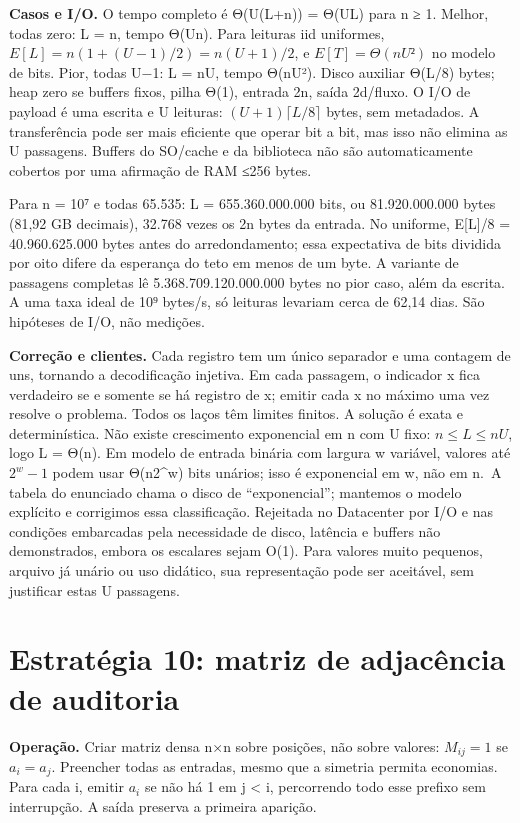 \documentclass[
  brazilian,
  11pt,
  a4paper,
]{article}
\let\oldsection\section
\renewcommand{\section}{\Needspace{6\baselineskip}\oldsection}
\begin{document}
\textbf{Casos e I/O.} O tempo completo é Θ(U(L+n)) = Θ(UL) para n ≥ 1.
Melhor, todas zero: L = n, tempo Θ(Un). Para leituras iid uniformes,
\(E[L]=n(1+(U-1)/2)=n(U+1)/2\), e \(E[T]=\Theta(nU²)\) no modelo de
bits. Pior, todas U−1: L = nU, tempo Θ(nU²). Disco auxiliar Θ(L/8)
bytes; heap zero se buffers fixos, pilha Θ(1), entrada 2n, saída
2d/fluxo. O I/O de payload é uma escrita e U leituras:
\((U+1)\lceil L/8\rceil\) bytes, sem metadados. A transferência pode ser
mais eficiente que operar bit a bit, mas isso não elimina as U
passagens. Buffers do SO/cache e da biblioteca não são automaticamente
cobertos por uma afirmação de RAM ≤256 bytes.

Para n = 10⁷ e todas 65.535: L = 655.360.000.000 bits, ou 81.920.000.000
bytes (81,92 GB decimais), 32.768 vezes os 2n bytes da entrada. No
uniforme, E{[}L{]}/8 = 40.960.625.000 bytes antes do arredondamento;
essa expectativa de bits dividida por oito difere da esperança do teto
em menos de um byte. A variante de passagens completas lê
5.368.709.120.000.000 bytes no pior caso, além da escrita. A uma taxa
ideal de 10⁹ bytes/s, só leituras levariam cerca de 62,14 dias. São
hipóteses de I/O, não medições.

\textbf{Correção e clientes.} Cada registro tem um único separador e uma
contagem de uns, tornando a decodificação injetiva. Em cada passagem, o
indicador x fica verdadeiro se e somente se há registro de x; emitir
cada x no máximo uma vez resolve o problema. Todos os laços têm limites
finitos. A solução é exata e determinística. Não existe crescimento
exponencial em n com U fixo: \(n\le L\le nU\), logo L = Θ(n). Em modelo
de entrada binária com largura w variável, valores até \(2^w-1\) podem
usar Θ(n2\^{}w) bits unários; isso é exponencial em w, não em n.~A
tabela do enunciado chama o disco de ``exponencial''; mantemos o modelo
explícito e corrigimos essa classificação. Rejeitada no Datacenter por
I/O e nas condições embarcadas pela necessidade de disco, latência e
buffers não demonstrados, embora os escalares sejam O(1). Para valores
muito pequenos, arquivo já unário ou uso didático, sua representação
pode ser aceitável, sem justificar estas U passagens.

\section{Estratégia 10: matriz de adjacência de
auditoria}\label{estratuxe9gia-10-matriz-de-adjacuxeancia-de-auditoria}

\textbf{Operação.} Criar matriz densa n×n sobre posições, não sobre
valores: \(M_{ij}=1\) se \(a_i=a_j\). Preencher todas as entradas, mesmo
que a simetria permita economias. Para cada i, emitir \(a_i\) se não há
1 em j \textless{} i, percorrendo todo esse prefixo sem interrupção. A
saída preserva a primeira aparição.
\end{document}
